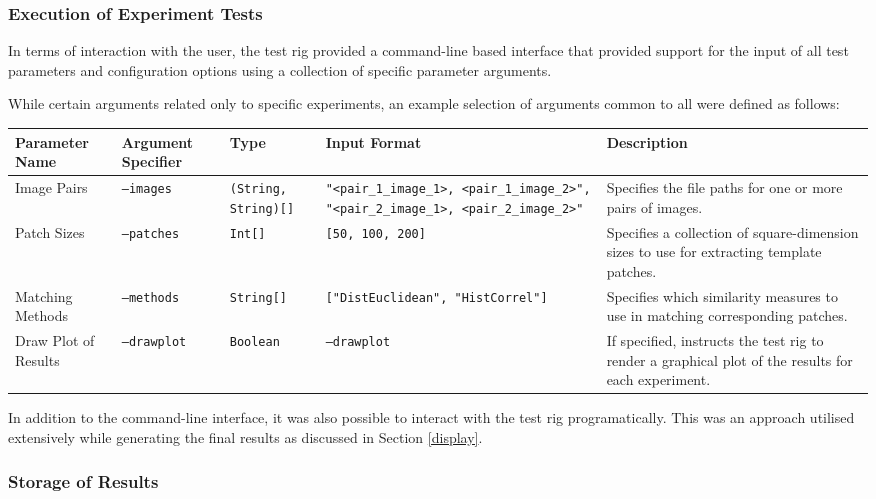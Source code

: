 
\subsubsection{Execution of Experiment Tests}

In terms of interaction with the user, the test rig provided a command-line based interface that provided support for the input of all test parameters and configuration options using a collection of specific parameter arguments. 

While certain arguments related only to specific experiments, an example selection of arguments common to all were defined as follows:

\begin{table}[h]
\small
\begin{tabular}{|p{2cm}|p{2cm}|p{2cm}|p{3.5cm}|p{3.5cm}|}
\hline
Parameter Name & Argument Specifier & Type  & Input Format & Description \\ \hline
Image Pairs & \texttt{--images} & \texttt{(String, String)[]} & \texttt{"\textless pair\_1\_image\_1\textgreater, \textless pair\_1\_image\_2\textgreater", "\textless pair\_2\_image\_1\textgreater, \textless pair\_2\_image\_2\textgreater"} & Specifies the file paths for one or more pairs of images. \\ \hline
Patch Sizes & \texttt{--patches} & \texttt{Int[]} & \texttt{[50, 100, 200]} & Specifies a collection of square-dimension sizes to use for extracting template patches. \\ \hline  
Matching Methods & \texttt{--methods} & \texttt{String[]} & \texttt{["DistEuclidean", "HistCorrel"]} & Specifies which similarity measures to use in matching corresponding patches. \\ \hline   
Draw Plot of Results & \texttt{--drawplot} & \texttt{Boolean} & \texttt{--drawplot} & If specified, instructs the test rig to render a graphical plot of the results for each experiment. \\ \hline  
\end{tabular}
\end{table}

In addition to the command-line interface, it was also possible to interact with the test rig programatically. This was an approach utilised extensively while generating the final results as discussed in Section \ref{display}.

\subsubsection{Storage of Results}

